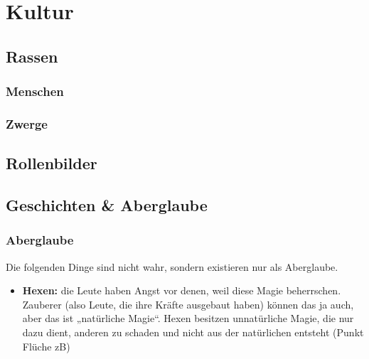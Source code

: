 \chapter{Kultur}
\section{Rassen}
\subsection{Menschen}
\subsection{Zwerge}

\section{Rollenbilder}
\section{Geschichten \& Aberglaube}
\subsection{Aberglaube}
Die folgenden Dinge sind nicht wahr, sondern existieren nur als Aberglaube.
\begin{itemize}
	\item \textbf{Hexen:} die Leute haben Angst vor denen, weil diese Magie beherrschen. Zauberer (also Leute, die ihre Kräfte ausgebaut haben) können das ja auch, aber das ist „natürliche Magie“. Hexen besitzen unnatürliche Magie, die nur dazu dient, anderen zu schaden und nicht aus der natürlichen entsteht (Punkt Flüche zB)
\end{itemize}